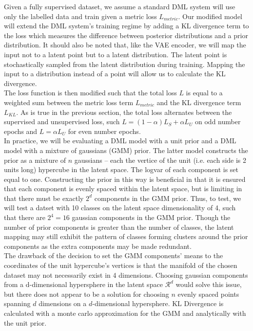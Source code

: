 \documentclass[./dissertation.tex]{subfiles}
\begin{document}
    Given a fully supervised dataset, we assume a standard DML system will use only the labelled data and train given a metric loss $L_{metric}$. Our modified model will extend the DML system's training regime by adding a KL divergence term to the loss which measures the difference between posterior distributions and a prior distribution. It should also be noted that, like the VAE encoder, we will map the input not to a latent point but to a latent distribution. The latent point is stochastically sampled from the latent distribution during training. Mapping the input to a distribution instead of a point will allow us to calculate the KL divergence. \\
    
    The loss function is then modified such that the total loss $L$ is equal to a weighted sum between the metric loss term $L_{metric}$ and the KL divergence term $L_{KL}$. As is true in the previous section, the total loss alternates between the supervised and unsupervised loss, such $L = (1 - \alpha) L_{S} + \alpha L_{U}$ on odd number epochs and $L = \alpha L_{U}$ for even number epochs. \\
    
    In practice, we will be evaluating a DML model with a unit prior and a DML model with a mixture of gaussians (GMM) prior. The latter model constructs the prior as a mixture of $n$ gaussians -- each the vertice of the unit (i.e. each side is 2 units long) hypercube in the latent space. The logvar of each component is set equal to one. Constructing the prior in this way is beneficial in that it is ensured that each component is evenly spaced within the latent space, but is limiting in that there must be exactly $2^{d}$ components in the GMM prior. Thus, to test, we will test a datset with 10 classes on the latent space dimensionality of 4, such that there are $2^{4} = 16$ gaussian components in the GMM prior. Though the number of prior components is greater than the number of classes, the latent mapping may still exhibit the pattern of classes forming clusters around the prior components as the extra components may be made redundant. \\
    
    The drawback of the decision to set the GMM components' means to the coordinates of the unit hypercube's vertices is that the manifold of the chosen dataset may not necessarily exist in 4 dimensions. Choosing gaussian components from a d-dimensional hypersphere in the latent space $\mathcal{R}^{d}$ would solve this issue, but there does not appear to be a solution for choosing $n$ evenly spaced points spanning $d$ dimensions on a $d$-dimensional hypersphere. KL Divergence is calculated with a monte carlo approximation for the GMM and analytically with the unit prior.
    
\end{document}
